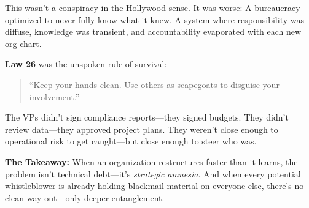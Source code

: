 \medskip

This wasn’t a conspiracy in the Hollywood sense. It was worse:  
A bureaucracy optimized to never fully know what it knew.  
A system where responsibility was diffuse, knowledge was transient, and accountability evaporated with each new org chart.

\medskip

\textbf{Law 26} was the unspoken rule of survival:
\begin{quote}
“Keep your hands clean. Use others as scapegoats to disguise your involvement.”
\end{quote}

The VPs didn’t sign compliance reports—they signed budgets.  
They didn’t review data—they approved project plans.  
They weren’t close enough to operational risk to get caught—but close enough to steer who was.

\medskip

\textbf{The Takeaway:}  
When an organization restructures faster than it learns, the problem isn’t technical debt—it’s \textit{strategic amnesia}.  
And when every potential whistleblower is already holding blackmail material on everyone else, there’s no clean way out—only deeper entanglement.

